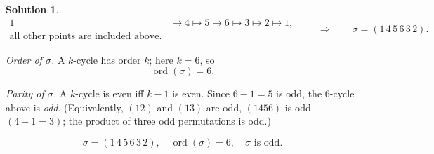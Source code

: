 \documentclass[12pt]{article}
\theoremstyle{definition} %
\newtheorem{solution}{Solution}
\theoremstyle{plain} %
\begin{document}
\begin{solution}
                        \[
                        \begin{aligned}
                        1&\mapsto4\mapsto5\mapsto6\mapsto3\mapsto2\mapsto1,\\
                        \text{all other points are included above}.
                        \end{aligned}
                        \qquad\Longrightarrow\qquad
                        \sigma=(1\,4\,5\,6\,3\,2).
                        \]
                        
                        \emph{Order of \(\sigma\).}  
                        A \(k\)-cycle has order \(k\); here \(k=6\), so
                        \[
                        \operatorname{ord}(\sigma)=6.
                        \]
                        
                        \emph{Parity of \(\sigma\).}  
                        A \(k\)-cycle is even iff \(k-1\) is even.  
                        Since \(6-1=5\) is odd, the \(6\)-cycle above is \emph{odd}.  
                        (Equivalently, \((12)\) and \((13)\) are odd, \((1456)\) is odd
                        \((4-1=3)\); the product of three odd permutations is odd.)
                        
                        \[
                        \boxed{\;
                           \sigma=(1\,4\,5\,6\,3\,2),\quad
                           \operatorname{ord}(\sigma)=6,\quad
                           \sigma\text{ is odd}.
                        \;}
                        \]
                        \end{solution}
\end{document}
